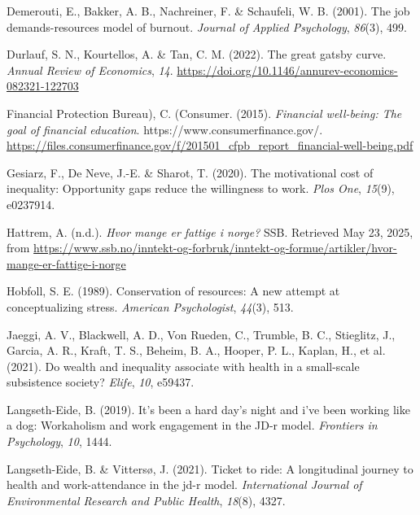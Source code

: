 \documentclass[
  12pt,
  a4paper,
  DIV=11,
  numbers=noendperiod]{scrartcl}
\newlength{\cslhangindent}
\newenvironment{CSLReferences}[2] %
 {\begin{list}{}{%
  \setlength{\itemindent}{0pt}
  \setlength{\leftmargin}{0pt}
  \setlength{\parsep}{0pt}
  \ifodd #1
   \setlength{\leftmargin}{\cslhangindent}
   \setlength{\itemindent}{-1\cslhangindent}
  \fi
  \setlength{\itemsep}{#2\baselineskip}}}
 {\end{list}}
\begin{document}
\label{refs}
\begin{CSLReferences}{1}{0}
Demerouti, E., Bakker, A. B., Nachreiner, F. \& Schaufeli, W. B. (2001).
The job demands-resources model of burnout. \emph{Journal of Applied
Psychology}, \emph{86}(3), 499.

Durlauf, S. N., Kourtellos, A. \& Tan, C. M. (2022). The great gatsby
curve. \emph{Annual Review of Economics}, \emph{14}.
\url{https://doi.org/10.1146/annurev-economics-082321-122703}

Financial Protection Bureau), C. (Consumer. (2015). \emph{Financial
well-being: The goal of financial education}.
https://www.consumerfinance.gov/.
\url{https://files.consumerfinance.gov/f/201501_cfpb_report_financial-well-being.pdf}

Gesiarz, F., De Neve, J.-E. \& Sharot, T. (2020). The motivational cost
of inequality: Opportunity gaps reduce the willingness to work.
\emph{Plos One}, \emph{15}(9), e0237914.

Hattrem, A. (n.d.). \emph{Hvor mange er fattige i norge?} SSB. Retrieved
May 23, 2025, from
\url{https://www.ssb.no/inntekt-og-forbruk/inntekt-og-formue/artikler/hvor-mange-er-fattige-i-norge}

Hobfoll, S. E. (1989). Conservation of resources: A new attempt at
conceptualizing stress. \emph{American Psychologist}, \emph{44}(3), 513.

Jaeggi, A. V., Blackwell, A. D., Von Rueden, C., Trumble, B. C.,
Stieglitz, J., Garcia, A. R., Kraft, T. S., Beheim, B. A., Hooper, P.
L., Kaplan, H., et al. (2021). Do wealth and inequality associate with
health in a small-scale subsistence society? \emph{Elife}, \emph{10},
e59437.

Langseth-Eide, B. (2019). It's been a hard day's night and i've been
working like a dog: Workaholism and work engagement in the JD-r model.
\emph{Frontiers in Psychology}, \emph{10}, 1444.

Langseth-Eide, B. \& Vittersø, J. (2021). Ticket to ride: A longitudinal
journey to health and work-attendance in the jd-r model.
\emph{International Journal of Environmental Research and Public
Health}, \emph{18}(8), 4327.


\end{CSLReferences}
\end{document}
